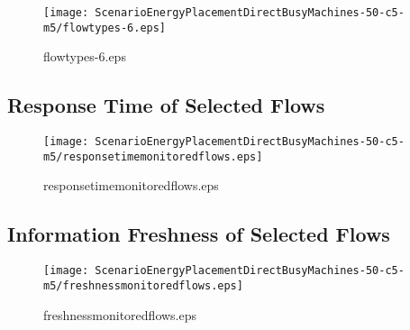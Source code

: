 \documentclass{elsart}
\begin{document}
\begin{figure}[ht]
\centering
\texttt{[image: ScenarioEnergyPlacementDirectBusyMachines-50-c5-m5/flowtypes-6.eps]}
\caption{flowtypes-6.eps}\label{fig:flowtypes-6}
\end{figure}

\clearpage
\subsection{Response Time of Selected Flows}

\begin{figure}[ht]
\centering
\texttt{[image: ScenarioEnergyPlacementDirectBusyMachines-50-c5-m5/responsetimemonitoredflows.eps]}
\caption{responsetimemonitoredflows.eps}\label{fig:responsetimemonitoredflows}
\end{figure}

\clearpage
\subsection{Information Freshness of Selected Flows}

\begin{figure}[ht]
\centering
\texttt{[image: ScenarioEnergyPlacementDirectBusyMachines-50-c5-m5/freshnessmonitoredflows.eps]}
\caption{freshnessmonitoredflows.eps}\label{fig:freshnessmonitoredflows}
\end{figure}

\clearpage
\end{document}
